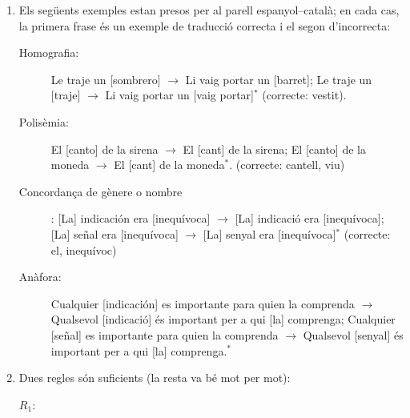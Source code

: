 \begin{enumerate}
\item 
   Els següents exemples estan presos per al parell 
   espanyol--català; en cada cas, la primera frase és un exemple de
   traducció correcta i el segon d'incorrecta:
   \begin{description}
   \item[Homografia:] Le traje un [sombrero] $\rightarrow$ 
     Li vaig portar un [barret]; 
     Le traje un [traje] $\rightarrow$ Li vaig portar un [vaig
     portar]$^*$ (correcte: vestit). 
    \item[Polisèmia:] El [canto] de la sirena $\rightarrow$ 
     El [cant] de la sirena;
     El [canto] de la moneda $\rightarrow$ El [cant] de la moneda$^*$.
     (correcte: cantell, viu)
     \item[Concordança de gènere o nombre]: 
     [La] indicación era [inequívoca]
     $\rightarrow$ [La] indicació era [inequívoca]; 
     [La] señal era [inequívoca]
     $\rightarrow$ [La] senyal era [inequívoca]$^*$ (correcte: 
     el, inequívoc)
     \item[Anàfora:] Cualquier [indicación] es importante para quien la
     comprenda $\rightarrow$ Qualsevol [indicació] és important per a qui [la]
     comprenga; Cualquier [señal] es importante para quien la
     comprenda $\rightarrow$ Qualsevol [senyal] és important per a qui [la]
     comprenga.$^*$
 \end{description}

\item  Dues regles són suficients (la resta va bé mot per mot):
 
  \begin{description}
  \item[$R_1$:] 


\end{description}
\end{enumerate}
